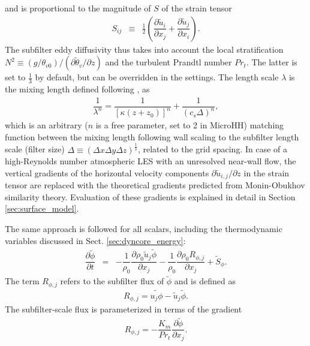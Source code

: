 \documentclass[gmd,manuscript]{copernicus}
\newcommand{\uf}{\ensuremath{\widetilde{u}}}
\newcommand{\thetaf}{\ensuremath{\widetilde{\theta}}}
\newcommand{\phif}{\ensuremath{\widetilde{\phi}}}
\begin{document}
and is proportional to the magnitude of $S$ of the strain tensor
\begin{eqnarray}
S_{ij} & \equiv & \frac{1}{2} \left( \dfrac{\partial \uf_i}{\partial x_j} + \dfrac{\partial \uf_j}{\partial x_i} \right).
\end{eqnarray}
The subfilter eddy diffusivity thus takes into account the local stratification $N^2 \equiv (g/\theta_{v0})/(\partial \thetaf_v / \partial z)$ and the turbulent Prandtl number $Pr_t$. The latter is set to $\frac{1}{3}$ by default, but can be overridden in the settings. The length scale  $\lambda$ is the mixing length defined following \citet{Mason1992}, as
\begin{eqnarray}
\dfrac{1}{\lambda^n} = \dfrac{1}{\left[ \kappa \left(z + z_0 \right) \right]^n} + \dfrac{1}{\left( c_s \Delta \right)^n},
\end{eqnarray}
which is an arbitrary ($n$ is a free parameter, set to 2 in MicroHH) matching function between the mixing length following wall scaling to the subfilter length scale (filter size) $\Delta \equiv (\Delta x \Delta y \Delta z)^\frac{1}{3}$, related to the grid spacing. In case of a high-Reynolds number atmospheric LES with an unresolved near-wall flow, the vertical gradients of the horizontal velocity components $\partial \uf_{i,j}/\partial z$  in the strain tensor are replaced with the theoretical gradients predicted from Monin-Obukhov similarity theory. Evaluation of these gradients is explained in detail in Section \ref{sec:surface_model}.

The same approach is followed for all scalars, including the thermodynamic variables discussed in Sect. \ref{sec:dyncore_energy}:
\begin{eqnarray}
\dfrac{\partial \phif}{\partial t} & = & - \dfrac{1}{\rho_0} \dfrac{\partial \rho_0 \uf_j \phif}{\partial x_j} - \dfrac{1}{\rho_0} \dfrac{\partial \rho_0 R_{\phi,j}}{\partial x_j} + \widetilde{S}_\phi. \label{eq:consscal_filter}
\end{eqnarray}
The term $R_{\phi,j}$ refers to the subfilter flux of $\phif$ and is defined as
\begin{eqnarray}
R_{\phi,j} = \widetilde{u_j \phi} - \uf_j \phif.
\end{eqnarray}
The subfilter-scale flux is parameterized in terms of the gradient
\begin{eqnarray}
R_{\phi,j} = - \dfrac{K_m}{Pr_t} \dfrac{\partial \phif}{\partial x_j}.
\end{eqnarray}
\end{document}
